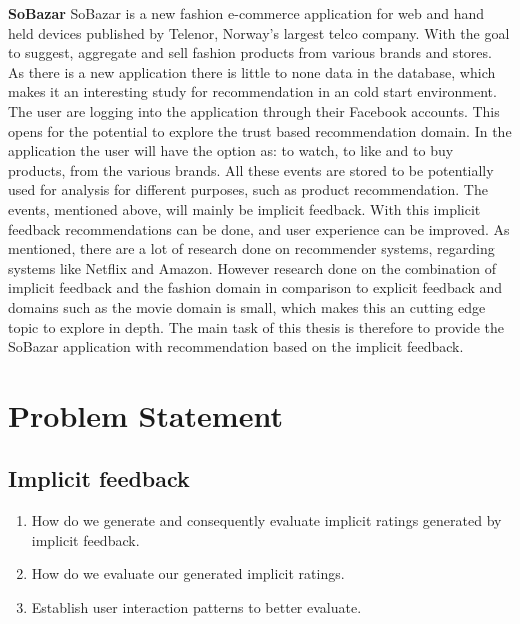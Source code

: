 \textbf{SoBazar}
SoBazar is a new fashion e-commerce application for web and hand held devices published by Telenor, Norway's largest telco company.
With the goal to suggest, aggregate and sell fashion products from various brands and stores.
As there is a new application there is little to none data in the database, which makes it an interesting study for recommendation in an cold start environment.
The user are logging into the application through their Facebook accounts.
This opens for the potential to explore the trust based recommendation domain.
In the application the user will have the option as: to watch, to like and to buy products, from the various brands.
All these events are stored to be potentially used for analysis for different purposes, such as product recommendation.
The events, mentioned above, will mainly be implicit feedback.
With this implicit feedback recommendations can be done, and user experience can be improved.
As mentioned, there are a lot of research done on recommender systems, regarding systems like Netflix and Amazon.
However research done on the combination of implicit feedback and the fashion domain in comparison to explicit feedback and domains such as the movie domain is small, which makes this an cutting edge topic to explore in depth.
The main task of this thesis is therefore to provide the SoBazar application with recommendation based on the implicit feedback.



\section{Problem Statement}

\subsection{Implicit feedback}
\begin{enumerate}
  \item How do we generate and consequently evaluate implicit ratings generated by implicit feedback.
  \item How do we evaluate our generated implicit ratings.
  \item Establish user interaction patterns to better evaluate.
\end{enumerate}

